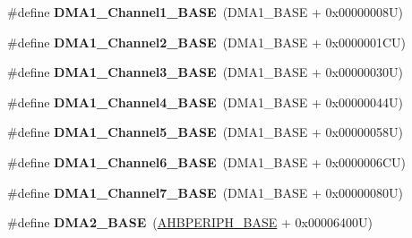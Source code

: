\begin{DoxyCompactItemize}
\item 
\hypertarget{group___peripheral__memory__map_ga888dbc1608243badeb3554ffedc7364c}{\#define {\bfseries D\-M\-A1\-\_\-\-Channel1\-\_\-\-B\-A\-S\-E}~(D\-M\-A1\-\_\-\-B\-A\-S\-E + 0x00000008\-U)}\label{group___peripheral__memory__map_ga888dbc1608243badeb3554ffedc7364c}

\item 
\hypertarget{group___peripheral__memory__map_ga38a70090eef3687e83fa6ac0c6d22267}{\#define {\bfseries D\-M\-A1\-\_\-\-Channel2\-\_\-\-B\-A\-S\-E}~(D\-M\-A1\-\_\-\-B\-A\-S\-E + 0x0000001\-C\-U)}\label{group___peripheral__memory__map_ga38a70090eef3687e83fa6ac0c6d22267}

\item 
\hypertarget{group___peripheral__memory__map_ga70b3d9f36ca9ce95b4e421c11154fe5d}{\#define {\bfseries D\-M\-A1\-\_\-\-Channel3\-\_\-\-B\-A\-S\-E}~(D\-M\-A1\-\_\-\-B\-A\-S\-E + 0x00000030\-U)}\label{group___peripheral__memory__map_ga70b3d9f36ca9ce95b4e421c11154fe5d}

\item 
\hypertarget{group___peripheral__memory__map_ga1adc93cd0baf0897202c71110e045692}{\#define {\bfseries D\-M\-A1\-\_\-\-Channel4\-\_\-\-B\-A\-S\-E}~(D\-M\-A1\-\_\-\-B\-A\-S\-E + 0x00000044\-U)}\label{group___peripheral__memory__map_ga1adc93cd0baf0897202c71110e045692}

\item 
\hypertarget{group___peripheral__memory__map_gac041a71cd6c1973964f847a68aa14478}{\#define {\bfseries D\-M\-A1\-\_\-\-Channel5\-\_\-\-B\-A\-S\-E}~(D\-M\-A1\-\_\-\-B\-A\-S\-E + 0x00000058\-U)}\label{group___peripheral__memory__map_gac041a71cd6c1973964f847a68aa14478}

\item 
\hypertarget{group___peripheral__memory__map_ga896c2c7585dd8bc3969cf8561f689d2d}{\#define {\bfseries D\-M\-A1\-\_\-\-Channel6\-\_\-\-B\-A\-S\-E}~(D\-M\-A1\-\_\-\-B\-A\-S\-E + 0x0000006\-C\-U)}\label{group___peripheral__memory__map_ga896c2c7585dd8bc3969cf8561f689d2d}

\item 
\hypertarget{group___peripheral__memory__map_gaeee0d1f77d0db1db533016a09351166c}{\#define {\bfseries D\-M\-A1\-\_\-\-Channel7\-\_\-\-B\-A\-S\-E}~(D\-M\-A1\-\_\-\-B\-A\-S\-E + 0x00000080\-U)}\label{group___peripheral__memory__map_gaeee0d1f77d0db1db533016a09351166c}

\item 
\hypertarget{group___peripheral__memory__map_gab72a9ae145053ee13d1d491fb5c1df64}{\#define {\bfseries D\-M\-A2\-\_\-\-B\-A\-S\-E}~(\hyperlink{group___peripheral__memory__map_ga92eb5d49730765d2abd0f5b09548f9f5}{A\-H\-B\-P\-E\-R\-I\-P\-H\-\_\-\-B\-A\-S\-E} + 0x00006400\-U)}\label{group___peripheral__memory__map_gab72a9ae145053ee13d1d491fb5c1df64}


\end{DoxyCompactItemize}

